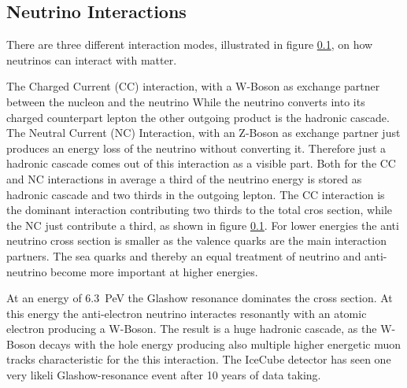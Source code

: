\subsection{Neutrino Interactions}

There are three different interaction modes, illustrated in figure \ref{}, on how neutrinos can interact with matter.
%         
%         
%         

The Charged Current (CC) interaction, with a W-Boson as exchange partner between the nucleon and the neutrino
While the neutrino converts into its charged counterpart lepton the other outgoing product is the hadronic cascade.
The Neutral Current (NC) Interaction, with an Z-Boson as exchange partner just produces an energy loss of the neutrino without converting it.
Therefore just a hadronic cascade comes out of this interaction as a visible part.
Both for the CC and NC interactions in average a third of the neutrino energy is stored as hadronic cascade and two thirds in the outgoing lepton.
The CC interaction is the dominant interaction contributing two thirds to the total cros section, while the NC just contribute a third, as shown in figure \ref{}.
For lower energies the anti neutrino cross section is smaller as the valence quarks are the main interaction partners.
The sea quarks and thereby an equal treatment of neutrino and anti-neutrino become more important at higher energies.

At an energy of \SI{6.3}{PeV} the Glashow resonance dominates the cross section.
At this energy the anti-electron neutrino interactes resonantly with an atomic electron producing a W-Boson.
The result is a huge hadronic cascade, as the W-Boson decays with the hole energy producing also multiple higher energetic muon tracks characteristic for the this interaction.
The IceCube detector has seen one very likeli Glashow-resonance event after 10 years of data taking.

